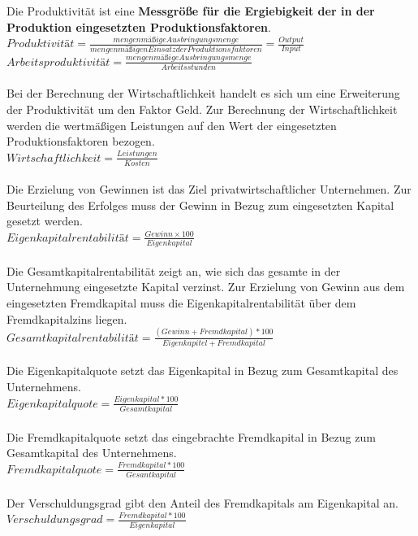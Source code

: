 Die Produktivität ist eine {\bf Messgröße für die Ergiebigkeit der in der Produktion eingesetzten Produktionsfaktoren}. \\
$Produktivität = \frac{mengenmäßige Ausbringungsmenge}{mengenmäßigen Einsatz der Produktionsfaktoren} = \frac{Output}{Input}$\\
$Arbeitsproduktivität = \frac{mengenmäßige Ausbringungsmenge}{Arbeitsstunden}$\\
\\
Bei der Berechnung der Wirtschaftlichkeit handelt es sich um eine Erweiterung der Produktivität um den Faktor Geld. Zur Berechnung der Wirtschaftlichkeit werden die wertmäßigen Leistungen auf den Wert der eingesetzten Produktionsfaktoren bezogen.\\
$Wirtschaftlichkeit = \frac{Leistungen}{Kosten}$\\
\\
Die Erzielung von Gewinnen ist das Ziel privatwirtschaftlicher Unternehmen. Zur Beurteilung des Erfolges muss der Gewinn in Bezug zum eingesetzten Kapital gesetzt werden.\\
$Eigenkapitalrentabilität = \frac{Gewinn \times 100}{Eigenkapital}$\\
\\
Die Gesamtkapitalrentabilität zeigt an, wie sich das gesamte in der Unternehmung eingesetzte Kapital verzinst. Zur Erzielung von Gewinn aus dem eingesetzten Fremdkapital muss die Eigenkapitalrentabilität über dem Fremdkapitalzins liegen.\\
$Gesamtkapitalrentabilität = \frac{(Gewinn + Fremdkapital) * 100}{Eigenkapitel + Fremdkapital}$\\
\\
Die Eigenkapitalquote setzt das Eigenkapital in Bezug zum Gesamtkapital des Unternehmens.\\
$Eigenkapitalquote = \frac{Eigenkapital * 100}{Gesamtkapital}$\\
\\
Die Fremdkapitalquote setzt das eingebrachte Fremdkapital in Bezug zum Gesamtkapital des Unternehmens.\\
$Fremdkapitalquote = \frac{Fremdkapital * 100}{Gesantkapital}$\\
\\
Der Verschuldungsgrad gibt den Anteil des Fremdkapitals am Eigenkapital an.\\
$Verschuldungsgrad = \frac{Fremdkapital * 100}{Eigenkapital}$\\
